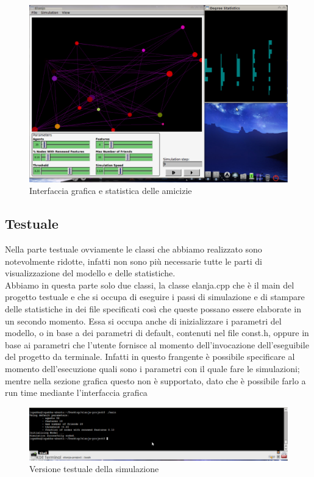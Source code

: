 \documentclass[a4paper,10pt]{article}
\begin{document}
\begin{figure}[!ht]
\begin{center}
\includegraphics[width=\textwidth]{GUI.eps}
\end{center}
\caption{Interfaccia grafica e statistica delle amicizie}
\end{figure}

\subsection{Testuale}
Nella parte testuale ovviamente le classi che abbiamo realizzato sono notevolmente ridotte, infatti non sono pi\`u necessarie tutte le parti
di visualizzazione del modello e delle statistiche.\\
Abbiamo in questa parte solo due classi, la classe elanja.cpp che \`e il main del progetto testuale e che si occupa di eseguire i passi di 
simulazione e di stampare delle statistiche in dei file specificati cos\`i che queste possano essere elaborate in un secondo momento. Essa si 
occupa anche di inizializzare i parametri del modello, o in base a dei parametri di default, contenuti nel file const.h, oppure in base ai
parametri che l'utente fornisce al momento dell'invocazione dell'eseguibile del progetto da terminale. Infatti in questo frangente \`e 
possibile specificare al momento dell'esecuzione quali sono i parametri con il quale fare le simulazioni; mentre nella sezione grafica questo 
non \`e supportato, dato che \`e possibile farlo a run time mediante l'interfaccia grafica

\begin{figure}[!ht]
\begin{center}
\includegraphics[width=\textwidth]{Text.eps}
\end{center}
\caption{Versione testuale della simulazione}
\end{figure}
\end{document}
